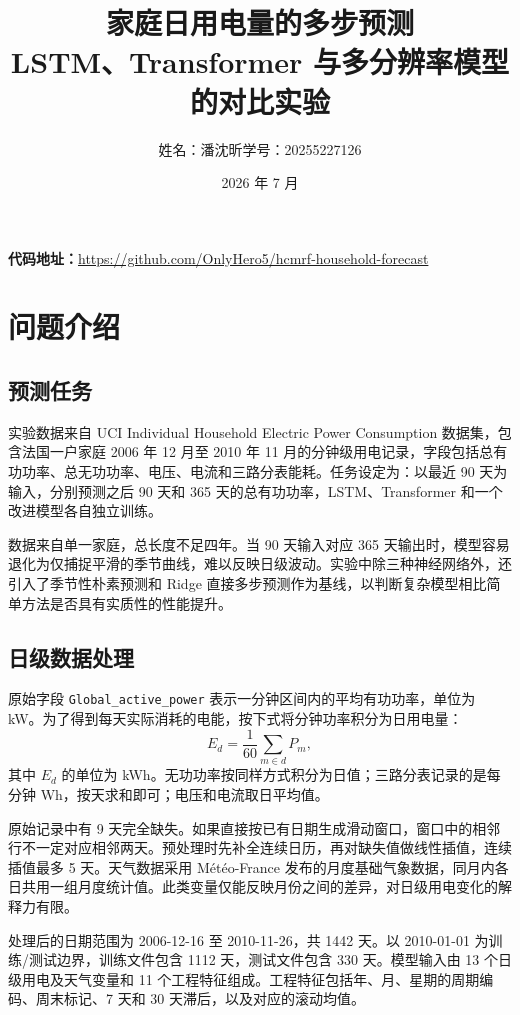 \documentclass[11pt,a4paper]{article}
\title{\bfseries 家庭日用电量的多步预测\\
\large LSTM、Transformer 与多分辨率模型的对比实验}
\author{
姓名：潘沈昕\quad 学号：20255227126
}
\date{2026 年 7 月}
\begin{document}
\maketitle

\noindent\textbf{代码地址：}\url{https://github.com/OnlyHero5/hcmrf-household-forecast}

\section{问题介绍}

\subsection{预测任务}

实验数据来自 UCI Individual Household Electric Power Consumption 数据集\cite{uci_power}，包含法国一户家庭 2006 年 12 月至 2010 年 11 月的分钟级用电记录，字段包括总有功功率、总无功功率、电压、电流和三路分表能耗。任务设定为：以最近 90 天为输入，分别预测之后 90 天和 365 天的总有功功率，LSTM、Transformer 和一个改进模型各自独立训练。

数据来自单一家庭，总长度不足四年。当 90 天输入对应 365 天输出时，模型容易退化为仅捕捉平滑的季节曲线，难以反映日级波动。实验中除三种神经网络外，还引入了季节性朴素预测和 Ridge 直接多步预测作为基线，以判断复杂模型相比简单方法是否具有实质性的性能提升。

\subsection{日级数据处理}

原始字段 \texttt{Global\_active\_power} 表示一分钟区间内的平均有功功率，单位为 kW。为了得到每天实际消耗的电能，按下式将分钟功率积分为日用电量：
\begin{equation}
E_d=\frac{1}{60}\sum_{m\in d}P_m,
\end{equation}
其中 $E_d$ 的单位为 kWh。无功功率按同样方式积分为日值；三路分表记录的是每分钟 Wh，按天求和即可；电压和电流取日平均值。

原始记录中有 9 天完全缺失。如果直接按已有日期生成滑动窗口，窗口中的相邻行不一定对应相邻两天。预处理时先补全连续日历，再对缺失值做线性插值，连续插值最多 5 天。天气数据采用 Météo-France 发布的月度基础气象数据\cite{meteo_monthly}，同月内各日共用一组月度统计值。此类变量仅能反映月份之间的差异，对日级用电变化的解释力有限。

处理后的日期范围为 2006-12-16 至 2010-11-26，共 1442 天。以 2010-01-01 为训练/测试边界，训练文件包含 1112 天，测试文件包含 330 天。模型输入由 13 个日级用电及天气变量和 11 个工程特征组成。工程特征包括年、月、星期的周期编码、周末标记、7 天和 30 天滞后，以及对应的滚动均值。
\end{document}
